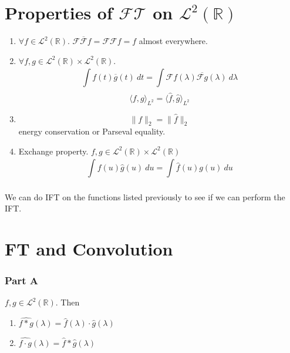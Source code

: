 \section{Properties of $ \mathscr{ FT }  $ on $ \mathscr{L}^2(\mathbb{R})  $}
\label{sec:Properties of $ \mathscr{ FT }  $ on $ \mathscr{L}^2(\mathbb{R})  $}
\begin{enumerate}
    \item $ \forall f\in \mathscr{L}^2(\mathbb{R})  $. $ \mathscr{ F\overline{F} } f =
        \mathscr{ FF } f = f $ almost everywhere.
    \item $ \forall f,g \in \mathscr{L}^2(\mathbb{R}) \times \mathscr{L}^2(\mathbb{R})  $. 
        \[
            \int\limits_{ }^{ } f(t) \overline{g}(t) \ dt = \int\limits_{ }^{ } \mathscr{
            F} f(\lambda) \overline{ \mathscr{ F } g} \left( \lambda \right) \ d\lambda 
        \]
        \[
            \langle f,g \rangle _{ L^2 }^{  } = \langle \widehat{f} , \widehat{g}  \rangle
            _{ L^2 }^{  } 
        \]
    \item 
        \[
            \| f \|^{ }_{ 2} = \| \widehat{f} \|^{ }_{ 2} 
        \]
        energy conservation or Parseval equality. 
    \item Exchange property. $ f,g \in \mathscr{L}^2(\mathbb{R}) \times \mathscr{L}^2(\mathbb{R})  $
        \[
            \int\limits_{ }^{ } f(u) \widehat{g}(u) \ du = \int\limits_{ }^{ }
            \widehat{f}(u) g(u) \ du 
        \]
\end{enumerate}
\begin{exmp}[]
    We can do IFT on the functions listed previously to see if we can perform the IFT. 
\end{exmp}

\section{FT and Convolution}
\label{sec:FT and Convolution}
\subsubsection{Part A}

$ f,g \in \mathscr{L}^2\left( \mathbb{R}\right)   $. 
Then 
\begin{enumerate}
    \item $\widehat{f*g} \left( \lambda \right) = \widehat{f}(\lambda) \cdot
        \widehat{g}(\lambda)  $
    \item $ \widehat{f \cdot g} \left( \lambda \right) = \widehat{f} * \widehat{g} \left(
        \lambda \right)  $
\end{enumerate}

